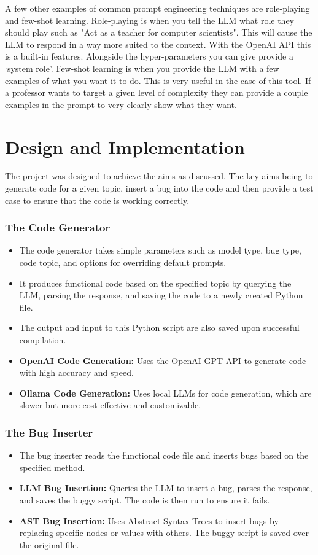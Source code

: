 \documentclass[12pt]{extarticle}
\begin{document}
A few other examples of common prompt engineering techniques are role-playing and few-shot learning. Role-playing is when you tell the LLM what role they should play such as "Act as a teacher for computer scientists". This will cause the LLM to respond in a way more suited to the context. With the OpenAI API this is a built-in features. Alongside the hyper-parameters you can give provide a `system role'. Few-shot learning is when you provide the LLM with a few examples of what you want it to do. This is very useful in the case of this tool. If a professor wants to target a given level of complexity they can provide a couple examples in the prompt to very clearly show what they want.

\newpage
\section{Design and Implementation}

The project was designed to achieve the aims as discussed. The key aims being to generate code for a given topic, insert a bug into the code and then provide a test case to ensure that the code is working correctly. 

\subsubsection{The Code Generator}
\begin{itemize}
    \item The code generator takes simple parameters such as model type, bug type, code topic, and options for overriding default prompts.
    \item It produces functional code based on the specified topic by querying the LLM, parsing the response, and saving the code to a newly created Python file.
    \item The output and input to this Python script are also saved upon successful compilation.
    \item \textbf{OpenAI Code Generation:} Uses the OpenAI GPT API to generate code with high accuracy and speed.
    \item \textbf{Ollama Code Generation:} Uses local LLMs for code generation, which are slower but more cost-effective and customizable.
\end{itemize}

\subsubsection{The Bug Inserter}
\begin{itemize}
    \item The bug inserter reads the functional code file and inserts bugs based on the specified method.
    \item \textbf{LLM Bug Insertion:} Queries the LLM to insert a bug, parses the response, and saves the buggy script. The code is then run to ensure it fails.
    \item \textbf{AST Bug Insertion:} Uses Abstract Syntax Trees to insert bugs by replacing specific nodes or values with others. The buggy script is saved over the original file.
\end{itemize}
\end{document}
